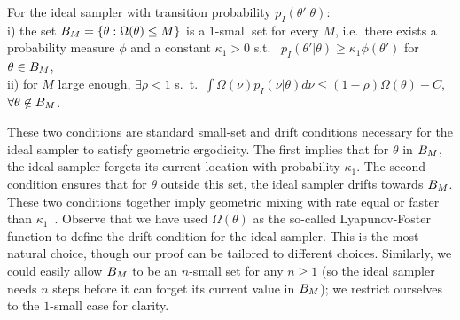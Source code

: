 \begin{assumption}
For the ideal sampler with transition probability $p_I(\theta'|\theta)$: \\
i) the set $B_M=\{\theta:\Omega(\theta)\le M \}$ is a $1$-small set for
every
$M$, i.e.\ there exists a probability measure $\phi$ and a constant
$\kappa_1 > 0$ s.t.\ %
$p_I(\theta'|\theta) \geq \kappa_1 \phi(\theta')$ for $\theta \in B_M$, \\
ii) for $M$ large enough, $\exists \rho < 1$ s.\ t.\
$\int \Omega(\nu) p_I(\nu|\theta) d\nu
\leq (1-\rho) \Omega(\theta)+C$, $\forall \theta \not\in B_M$.
  \label{asmp:ideal_geom}
\end{assumption}
\noindent %
These two conditions are standard
small-set and drift conditions necessary for the ideal sampler to satisfy
geometric ergodicity. The first implies that for $\theta$ in
$B_M$, the ideal sampler forgets its current
location with probability $\kappa_1$. The second condition ensures that
for $\theta$ outside this set, the ideal sampler drifts towards
$B_M$. These two conditions together imply geometric
mixing with rate equal or faster than $\kappa_1$~\cite{meyn2009}.
Observe that we have used $\Omega(\theta)$ as the so-called 
Lyapunov-Foster function to define the drift condition for the ideal 
sampler. %
This is the most natural choice,
though our proof can be tailored to different choices. Similarly, we
could easily allow $B_M$ to be an $n$-small set for any $n\ge 1$ (so
the ideal sampler needs $n$ steps before it can forget its current
value in $B_M$); we restrict ourselves to the $1$-small case for
clarity.




